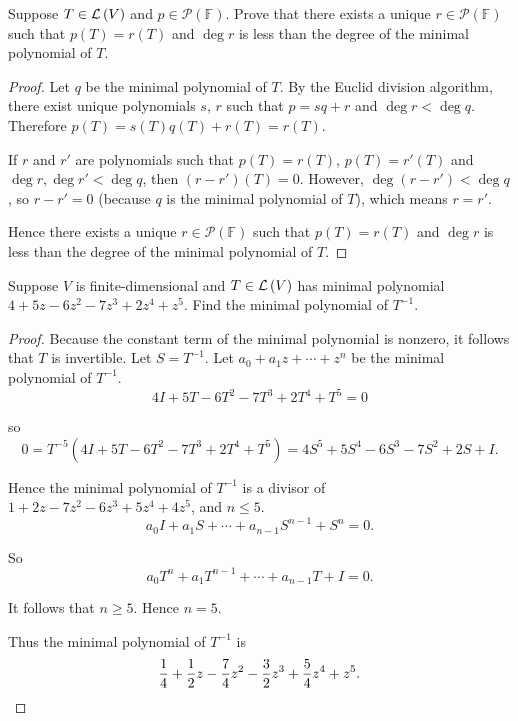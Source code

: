 \begin{exercise}
    Suppose $T\in\mathcal{L}\left({V}\right)$ and $p\in\mathscr{P}(\mathbb{F})$. Prove that there exists a unique $r\in \mathscr{P}(\mathbb{F})$ such that $p(T) = r(T)$ and $\deg r$ is less than the degree of the minimal polynomial of $T$.
\end{exercise}

\begin{proof}
    Let $q$ be the minimal polynomial of $T$. By the Euclid division algorithm, there exist unique polynomials $s$, $r$ such that $p = sq + r$ and $\deg r < \deg q$. Therefore $p(T) = s(T)q(T) + r(T) = r(T)$.

    If $r$ and $r'$ are polynomials such that $p(T) = r(T)$, $p(T) = r'(T)$ and $\deg r, \deg r' < \deg q$, then $(r - r')(T) = 0$. However, $\deg (r - r') < \deg q$, so $r - r' = 0$ (because $q$ is the minimal polynomial of $T$), which means $r = r'$.

    Hence there exists a unique $r\in \mathscr{P}(\mathbb{F})$ such that $p(T) = r(T)$ and $\deg r$ is less than the degree of the minimal polynomial of $T$.
\end{proof}
\newpage

\begin{exercise}
    Suppose $V$ is finite-dimensional and $T\in\mathcal{L}\left({V}\right)$ has minimal polynomial $4 + 5z - 6z^{2} - 7z^{3} + 2z^{4} + z^{5}$. Find the minimal polynomial of $T^{-1}$.
\end{exercise}

\begin{proof}
    Because the constant term of the minimal polynomial is nonzero, it follows that $T$ is invertible. Let $S = T^{-1}$. Let $a_{0} + a_{1}z + \cdots + z^{n}$ be the minimal polynomial of $T^{-1}$.
    \[
        4I + 5T - 6T^{2} - 7T^{3} + 2T^{4} + T^{5} = 0
    \]

    so
    \[
        0 = T^{-5}(4I + 5T - 6T^{2} - 7T^{3} + 2T^{4} + T^{5}) = 4S^{5} + 5S^{4} - 6S^{3} - 7S^{2} + 2S + I.
    \]

    Hence the minimal polynomial of $T^{-1}$ is a divisor of $1 + 2z - 7z^{2} - 6z^{3} + 5z^{4} + 4z^{5}$, and $n\leq 5$.
    \[
        a_{0}I + a_{1}S+ \cdots + a_{n-1}S^{n-1} + S^{n} = 0.
    \]

    So
    \[
        a_{0}T^{n} + a_{1}T^{n-1} + \cdots + a_{n-1}T + I = 0.
    \]

    It follows that $n\geq 5$. Hence $n = 5$.

    Thus the minimal polynomial of $T^{-1}$ is
    \[
        \frac{1}{4} + \frac{1}{2}z - \frac{7}{4}z^{2} - \frac{3}{2}z^{3} + \frac{5}{4}z^{4} + z^{5}.\qedhere
    \]
\end{proof}
\newpage

